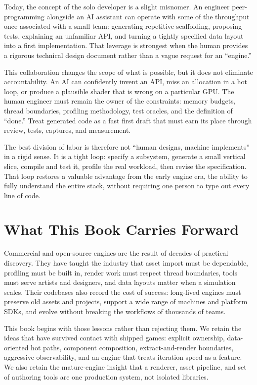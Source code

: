 \documentclass[
  11pt,
  letterpaper,
  DIV=11,
  numbers=noendperiod,
  twoside,
  open=right]{scrreprt}
\begin{document}
Today, the concept of the solo developer is a slight misnomer. An
engineer peer-programming alongside an AI assistant can operate with
some of the throughput once associated with a small team: generating
repetitive scaffolding, proposing tests, explaining an unfamiliar API,
and turning a tightly specified data layout into a first implementation.
That leverage is strongest when the human provides a rigorous technical
design document rather than a vague request for an ``engine.''

This collaboration changes the scope of what is possible, but it does
not eliminate accountability. An AI can confidently invent an API, miss
an allocation in a hot loop, or produce a plausible shader that is wrong
on a particular GPU. The human engineer must remain the owner of the
constraints: memory budgets, thread boundaries, profiling methodology,
test oracles, and the definition of ``done.'' Treat generated code as a
fast first draft that must earn its place through review, tests,
captures, and measurement.

The best division of labor is therefore not ``human designs, machine
implements'' in a rigid sense. It is a tight loop: specify a subsystem,
generate a small vertical slice, compile and test it, profile the real
workload, then revise the specification. That loop restores a valuable
advantage from the early engine era, the ability to fully understand the
entire stack, without requiring one person to type out every line of
code.

\section{What This Book Carries
Forward}\label{what-this-book-carries-forward}

Commercial and open-source engines are the result of decades of
practical discovery. They have taught the industry that asset import
must be dependable, profiling must be built in, render work must respect
thread boundaries, tools must serve artists and designers, and data
layouts matter when a simulation scales. Their codebases also record the
cost of success: long-lived engines must preserve old assets and
projects, support a wide range of machines and platform SDKs, and evolve
without breaking the workflows of thousands of teams.

This book begins with those lessons rather than rejecting them. We
retain the ideas that have survived contact with shipped games: explicit
ownership, data-oriented hot paths, component composition,
extract-and-render boundaries, aggressive observability, and an engine
that treats iteration speed as a feature. We also retain the
mature-engine insight that a renderer, asset pipeline, and set of
authoring tools are one production system, not isolated libraries.
\end{document}
